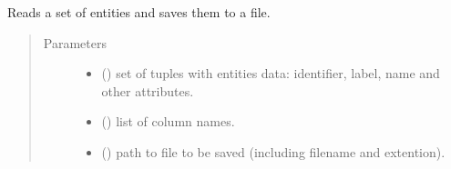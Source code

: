 \documentclass[letterpaper,10pt,english]{sphinxmanual}
\begin{document}
\begin{fulllineitems}
\label{\detokenize{_autosummary/graphdb_builder:graphdb_builder.builder_utils.write_entities}}
Reads a set of entities and saves them to a file.
\begin{quote}\begin{description}
\item[{Parameters}] \leavevmode\begin{itemize}
\item {} 
 () \textendash{} set of tuples with entities data: identifier, label, name                        and other attributes.

\item {} 
 () \textendash{} list of column names.

\item {} 
 () \textendash{} path to file to be saved (including filename and extention).

\end{itemize}

\end{description}\end{quote}

\end{fulllineitems}

\end{document}
